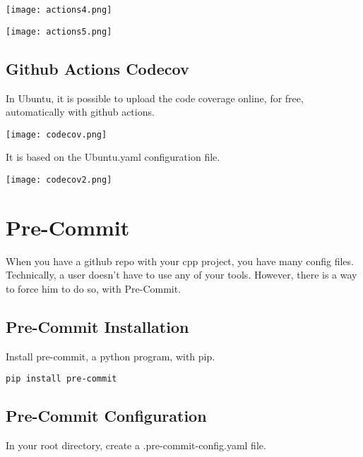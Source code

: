 \documentclass[openany]{report}
\begin{document}
\begin{center}
    \texttt{[image: actions4.png]}
\end{center}


\begin{center}
    \texttt{[image: actions5.png]}
\end{center}


\subsection{Github Actions Codecov}

In Ubuntu, it is possible to upload the code coverage online, for free, automatically with github actions.

\begin{center}
    \texttt{[image: codecov.png]}
\end{center}

It is based on the Ubuntu.yaml configuration file.

\begin{center}
    \texttt{[image: codecov2.png]}
\end{center}



\section{Pre-Commit}

When you have a github repo with your cpp project, you have many config files. Technically,
a user doesn't have to use any of your tools. However, there is a way to force him to do so, with 
Pre-Commit.


\subsection{Pre-Commit Installation}

Install pre-commit, a python program, with pip.

\begin{verbatim}
pip install pre-commit
\end{verbatim}


\subsection{Pre-Commit Configuration}

In your root directory, create a .pre-commit-config.yaml file.
\end{document}
